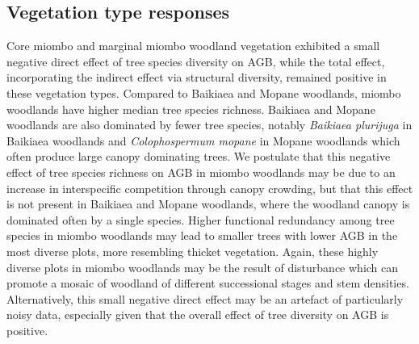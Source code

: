 \documentclass[11pt,a4paper]{article}
\begin{document}
\subsection{Vegetation type responses}


Core miombo and marginal miombo woodland vegetation exhibited a small negative direct effect of tree species diversity on AGB, while the total effect, incorporating the indirect effect via  structural diversity, remained positive in these vegetation types. Compared to Baikiaea and Mopane woodlands, miombo woodlands have higher median tree species richness. Baikiaea and Mopane woodlands are also dominated by fewer tree species, notably \textit{Baikiaea plurijuga} in Baikiaea woodlands and \textit{Colophospermum mopane} in Mopane woodlands which often produce large canopy dominating trees. We postulate that this negative effect of tree species richness on AGB in miombo woodlands may be due to an increase in interspecific competition through canopy crowding, but that this effect is not present in Baikiaea and Mopane woodlands, where the woodland canopy is dominated often by a single species. Higher functional redundancy among tree species in miombo woodlands may lead to smaller trees with lower AGB in the most diverse plots, more resembling thicket vegetation. Again, these highly diverse plots in miombo woodlands may be the result of disturbance which can promote a mosaic of woodland of different successional stages and stem densities. Alternatively, this small negative direct effect may be an artefact of particularly noisy data, especially given that the overall effect of tree diversity on AGB is positive.
\end{document}
